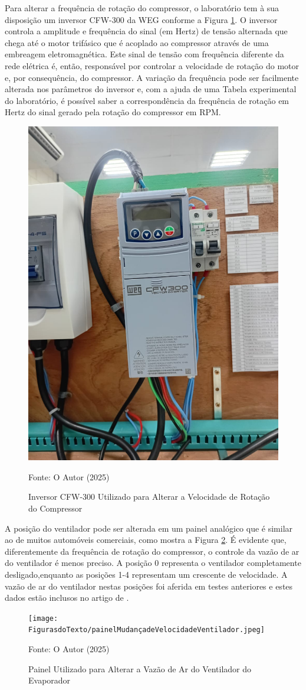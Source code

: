 Para alterar a frequência de rotação do compressor, o laboratório \textcite{reve2023} tem à sua disposição um inversor CFW-300 da WEG conforme a Figura \ref{fig:inversor CFW-300}. O inversor controla a amplitude e frequência do sinal (em Hertz) de tensão alternada que chega até o motor trifásico que é acoplado ao compressor através de uma embreagem eletromagnética. Este sinal de tensão com frequência diferente da rede elétrica é, então, responsável por controlar a velocidade de rotação do motor e, por consequência, do compressor. A variação da frequência pode ser facilmente alterada nos parâmetros do inversor e, com a ajuda de uma Tabela experimental do laboratório, é possível saber a correspondência da frequência de rotação em Hertz do sinal gerado pela rotação do compressor em RPM.

\begin{figure}[h]
    \centering
    \includegraphics[width=0.45\linewidth]{FigurasdoTexto/inversorcfw-300.jpeg}
    \caption{Inversor CFW-300 Utilizado para Alterar a Velocidade de Rotação do Compressor}
    \label{fig:inversor CFW-300}
    {\footnotesize Fonte: O Autor (2025)}
\end{figure}

A posição do ventilador pode ser alterada em um painel analógico que é similar ao de muitos automóveis comerciais, como mostra a Figura \ref{fig:painelMudançadeVelocidadeVentilador}. É evidente que, diferentemente da frequência de rotação do compressor, o controle da vazão de ar do ventilador é menos preciso. A posição 0 representa o ventilador completamente desligado,enquanto as posições 1-4 representam um crescente de velocidade. A vazão de ar do ventilador nestas posições foi aferida em testes anteriores e estes dados estão inclusos no artigo de \textcite{ExperimentalThermalPerformance}.
\newpage
\begin{figure}[h]
    \centering
    \texttt{[image: FigurasdoTexto/painelMudançadeVelocidadeVentilador.jpeg]}
    \caption{Painel Utilizado para Alterar a Vazão de Ar do Ventilador do Evaporador}
    \label{fig:painelMudançadeVelocidadeVentilador}

    {\footnotesize Fonte: O Autor (2025)}

\end{figure}

